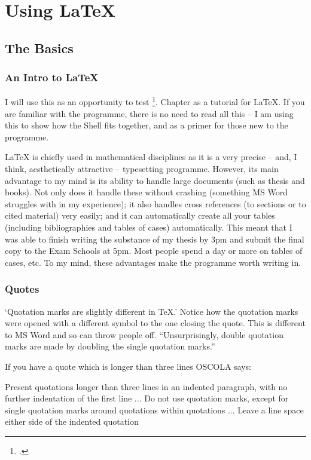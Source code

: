 \chapter{Using LaTeX}

\section{The Basics}

\subsection{An Intro to LaTeX}
I will use this as an opportunity to test \footcite{bocardo10}. Chapter as a tutorial for LaTeX. If you are familiar with the programme, there is no need to read all this -- I am using this to show how the Shell fits together, and as a primer for those new to the programme.

LaTeX is chiefly used in mathematical disciplines as it is a very precise -- and, I think, aesthetically attractive -- typesetting programme. However, its main advantage to my mind is its ability to handle large documents (such as thesis and books). Not only does it handle these without crashing (something MS Word struggles with in my experience); it also handles cross references (to sections or to cited material) very easily; and it can automatically create all your tables (including bibliographies and tables of cases) automatically. This meant that I was able to finish writing the substance of my thesis by 3pm and submit the final copy to the Exam Schools at 5pm. Most people spend a day or more on tables of cases, etc. To my mind, these advantages make the programme worth writing in. 

\subsection{Quotes}
`Quotation marks are slightly different in TeX.' Notice how the quotation marks were opened with a different symbol to the one closing the quote. This is different to MS Word and so can throw people off. ``Unsurprisingly, double quotation marks are made by doubling the single quotation marks.''

If you have a quote which is longer than three lines OSCOLA says: 
\begin{quoting}
Present quotations longer than three lines in an indented paragraph, with no further indentation of the first line ... Do not use quotation marks, except for single quotation marks around quotations within quotations ... Leave a line space either side of the indented quotation 
\end{quoting}

